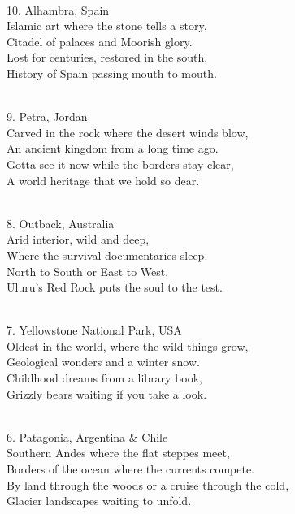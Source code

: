\begin{lyrics}

\\
10. %
Alhambra, Spain
\\
Islamic art where the stone tells a story,\\
Citadel of palaces and Moorish glory.\\
Lost for centuries, restored in the south,\\
History of Spain passing mouth to mouth.

\\
9. %
Petra, Jordan
\\
Carved in the rock where the desert winds blow,\\
An ancient kingdom from a long time ago.\\
Gotta see it now while the borders stay clear,\\
A world heritage that we hold so dear.

\\
8. %
Outback, Australia
\\
Arid interior, wild and deep,\\
Where the survival documentaries sleep.\\
North to South or East to West,\\
Uluru’s Red Rock puts the soul to the test.

\\
7. %
Yellowstone National Park, USA
\\
Oldest in the world, where the wild things grow,\\
Geological wonders and a winter snow.\\
Childhood dreams from a library book,\\
Grizzly bears waiting if you take a look.

\\
6. %
Patagonia, Argentina \& Chile
\\
Southern Andes where the flat steppes meet,\\
Borders of the ocean where the currents compete.\\
By land through the woods or a cruise through the cold,\\
Glacier landscapes waiting to unfold.


\end{lyrics}
